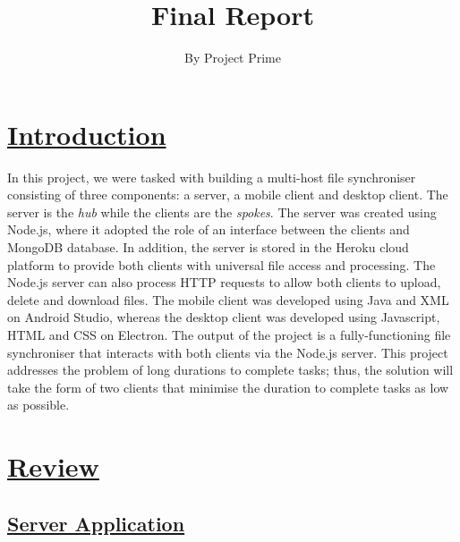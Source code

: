 \documentclass{article}
\title{Final Report}
\author{By Project Prime}
\begin{document}
 \maketitle
 \section{\underline{Introduction}}
In this project, we were tasked with building a multi-host file synchroniser consisting of three components: a server, a mobile client and desktop client. The server is the \textit{hub} while the clients are the \textit{spokes}. The server was created using Node.js, where it adopted the role of an interface between the clients and MongoDB database. In addition, the server is stored in the Heroku cloud platform to provide both clients with universal file access and processing. The Node.js server can also process HTTP requests to allow both clients to upload, delete and download files. The mobile client was developed using Java and XML on Android Studio, whereas the desktop client was developed using Javascript, HTML and CSS on Electron. The output of the project is a fully-functioning file synchroniser that interacts with both clients via the Node.js server. This project addresses the problem of long durations to complete tasks; thus, the solution will take the form of two clients that minimise the duration to complete tasks as low as possible.

\section{\underline{Review}}
\subsection{\underline{Server Application}}
\end{document}
